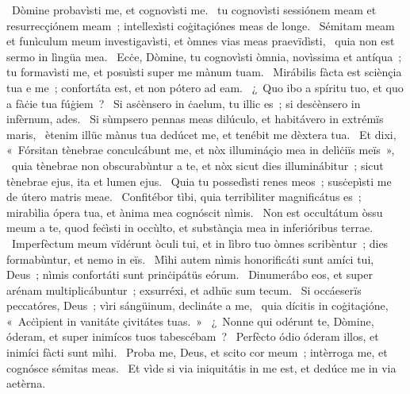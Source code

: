 \psalmChapterWithInscription{}
{ }
{%
~Dòmine probavìsti me, et cognovìsti me. 
~tu cognovìsti sessiónem meam et resurrecçiónem meam~; intellexìsti coġitaçiónes meas de longe. 
~Sémitam meam et funìculum meum investigavìsti, et òmnes vias meas praevïdìsti, 
~quia non est sermo in lìngüa mea. 
~Ecċe, Dòmine, tu cognovìsti òmnia, novìssima et antíqua~; tu formavìsti me, et posuìsti super me mànum tuam. 
~Mirábilis fàcta est sciènçia tua e me~; confortáta est, et non pótero ad eam. 
~¿~Quo ibo a spíritu tuo, et quo a fàċie tua fúġiem~? 
~Si asċènsero in ċaelum, tu illic es~; si desċènsero in infèrnum, ades. 
~Si sùmpsero pennas meas dilúculo, et habitávero in extrémïs maris, 
~ètenim illüc mànus tua dedúcet me, et tenébit me dèxtera tua. 
~Et dixi, «~Fórsitan tènebrae conculcábunt me, et nòx illumináçio mea in delìċiïs meïs~», 
~quia tènebrae non obscurabùntur a te, et nòx sicut dies illuminábitur~; sicut tènebrae ejus, ita et lumen ejus. 
~Quia tu possedìsti renes meos~; susċepìsti me de útero matris meae. 
~Confitébor tìbi, quia terribìliter magnificátus es~; mirabìlia ópera tua, et ànima mea cognóscit nìmis. 
~Non est occultátum òssu meum a te, quod feċìsti in occùlto, et substànçia mea in inferióribus terrae. 
~Imperfèctum meum vïdérunt òculi tui, et in lìbro tuo òmnes scribèntur~; dies formabùntur, et nemo in eïs. 
~Mìhi autem nìmis honorificáti sunt amíci tui, Deus~; nìmis confortáti sunt prinċipátüs eórum. 
~Dinumerábo eos, et super arénam multiplicábuntur~; exsurréxi, et adhüc sum tecum. 
~Si occáeserïs peccatóres, Deus~; vìri sángüinum, declináte a me, 
~quia dícitis in coġitaçióne, «~Acċìpient in vanitáte çivitátes tuas.~»
~¿~Nonne qui odérunt te, Dòmine, óderam, et super inimícos tuos tabescébam~? 
~Perfècto ódio óderam illos, et inimíci fàcti sunt mìhi. 
~Proba me, Deus, et scito cor meum~; intèrroga me, et cognósce sémitas meas. 
~Et vìde si via iniquitátis in me est, et dedúce me in via aetèrna. 
}
